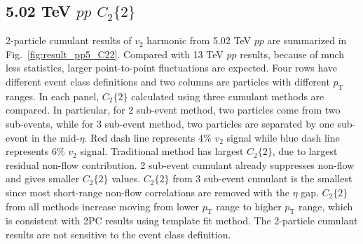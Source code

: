 \subsection{5.02 TeV $pp$ $C_{2}\{2\}$}
2-particle cumulant results of $v_{2}$ harmonic from 5.02 TeV $pp$ are summarized in Fig.~\ref{fig:result_pp5_C22}. Compared with 13 TeV $pp$ results, because of much less statistics, larger point-to-point fluctuations are expected. Four rows have different event class definitions and two columns are particles with different $p_{\text{T}}$ ranges. In each panel, $C_{2}\{2\}$ calculated using three cumulant methods are compared. In particular, for 2 sub-event method, two particles come from two sub-events, while for 3 sub-event method, two particles are separated by one sub-event in the mid-$\eta$. Red dash line represents $4\%$ $v_{2}$ signal while blue dash line represents $6\%$ $v_{2}$ signal. Traditional method has largest $C_{2}\{2\}$, due to largest residual non-flow contribution. 2 sub-event cumulant already suppresses non-flow and gives smaller $C_{2}\{2\}$ values. $C_{2}\{2\}$ from 3 sub-event cumulant is the smallest since most short-range non-flow correlations are removed with the $\eta$ gap. $C_{2}\{2\}$ from all methods increase moving from lower $p_{\text{T}}$ range to higher $p_{\text{T}}$ range, which is consistent with 2PC results using template fit method. The 2-particle cumulant results are not sensitive to the event class definition.
